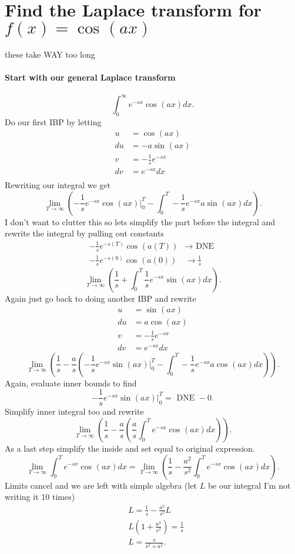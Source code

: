 \section{Find the Laplace transform for $f\left( x \right) =\cos^{}( ax )$}%
these take WAY too long
\paragraph{Start with our general Laplace transform}
\[
\int_{0}^{\infty} e^{-sx}\cos^{}( ax )dx
.\] 
Do our first IBP by letting
\begin{align*}
  u &= \cos^{}( ax ) \\
  du &= -a\sin^{}( ax ) \\
  v &= -\frac{1}{s}e^{-sx} \\
  dv &= e^{-sx}dx \\
\end{align*}
Rewriting our integral we get
\[
\lim_{T \to \infty} \left(  -\frac{1}{s}e^{-sx}\cos^{}( ax )\big|^{T}_{0}-\int_{0}^{T} -\frac{1}{s}e^{-sx}a\sin^{}( ax )dx\right) 
.\] 
I don't want to clutter this so lets simplify the part before the integral and rewrite the integral by pulling out constants
\begin{align*}
  -\frac{1}{s}e^{-s\left( T \right) }\cos^{}( a\left( T \right) ) &\to \text{ DNE }\\
  -\frac{1}{s}e^{-s\left( 0 \right) }\cos^{}( a\left( 0 \right)  ) &\to \frac{1}{s}
\end{align*}
\[
  \lim_{T \to \infty} \left(  \frac{1}{s}+\int_{0}^{T}\frac{1}{s}e^{-sx}\sin^{}( ax )dx \right) 
.\] 
Again just go back to doing another IBP and rewrite
\begin{align*}
  u &= \sin^{}( ax ) \\
  du &= a\cos^{}( ax ) \\
  v &= -\frac{1}{s}e^{-sx} \\
  dv &= e^{-sx}dx 
\end{align*}
\[
\lim_{T \to \infty} \left( \frac{1}{s}-\frac{a}{s} \left( -\frac{1}{s}e^{-sx}\sin^{}( ax )\big|^{T}_{0}-\int_{0}^{T} -\frac{1}{s}e^{-sx}a\cos^{}( ax )dx \right)  \right) 
.\] 
Again, evaluate inner bounds to find
\[
-\frac{1}{s}e^{-sx}\sin^{}( ax )\big|^{T}_{0} = \text{ DNE }-0
.\] 
Simplify inner integral too and rewrite
\newpage
\[
  \lim_{T \to \infty} \left( \frac{1}{s}-\frac{a}{s}\left( \frac{a}{s}\int_{0}^{T} e^{-sx}\cos^{}( ax )dx \right)  \right) 
.\] 
As a last step simplify the inside and set equal to original expression.
\[
\lim_{T \to \infty}\int_{0}^{T} e^{-sx}\cos^{}( ax )dx=\lim_{T \to \infty} \left( \frac{1}{s}-\frac{a^2}{s^2}\int_{0}^{T} e^{-sx}\cos^{}( ax )dx \right) 
.\] 
Limits cancel and we are left with simple algebra (let $L$ be our integral I'm not writing it 10 times)
\begin{align*}
  &L = \frac{1}{s}-\frac{a^2}{s^2}L \\
  &L\left( 1+\frac{a^2}{s^2} \right) = \frac{1}{s} \\
  &L = \frac{s}{s^2+a^2}.
\end{align*}
